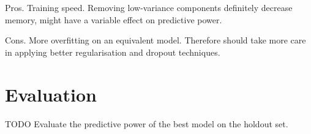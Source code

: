 \documentclass[10pt, twocolumn]{article}
\begin{document}
Pros. Training speed. Removing low-variance components definitely decrease memory, might have a variable effect on predictive power.

Cons. More overfitting on an equivalent model. Therefore should take more care in applying better regularisation and dropout techniques. 




\section{Evaluation}
TODO Evaluate the predictive power of the best model on the holdout set.


\medskip
 


\end{document}
